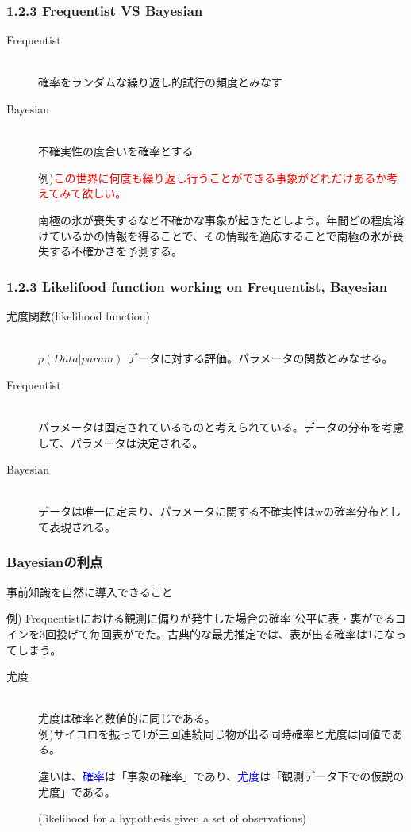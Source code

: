 \documentclass[dvipdfmx]{beamer}
\theoremstyle{definition}
\begin{document}
\begin{frame}
  \frametitle{1.2.3 Frequentist VS Bayesian}
  \begin{description}
    \item[Frequentist] \hfill \\
      確率をランダムな繰り返し的試行の頻度とみなす
    \item[Bayesian] \hfill \\
      不確実性の度合いを確率とする
      
      例)\textcolor{red}{この世界に何度も繰り返し行うことができる事象がどれだけあるか考えてみて欲しい。}
      
      南極の氷が喪失するなど不確かな事象が起きたとしよう。年間どの程度溶けているかの情報を得ることで、その情報を適応することで南極の氷が喪失する不確かさを予測する。
  \end{description}
\end{frame}

\begin{frame}
  \frametitle{1.2.3 Likelifood function  working on Frequentist, Bayesian}
  \begin{description}
    \item[尤度関数(likelihood function)] \hfill \\
      $p(Data|param)$ \quad データに対する評価。パラメータの関数とみなせる。
    \item[Frequentist] \hfill \\
      パラメータは固定されているものと考えられている。データの分布を考慮して、パラメータは決定される。
    \item[Bayesian] \hfill \\
      データは唯一に定まり、パラメータに関する不確実性はwの確率分布として表現される。
  \end{description}
\end{frame}

\begin{frame}
  \frametitle{Bayesianの利点}
  事前知識を自然に導入できること

  \begin{block}{例) Frequentistにおける観測に偏りが発生した場合の確率}
    公平に表・裏がでるコインを3回投げて毎回表がでた。古典的な最尤推定では、表が出る確率は1になってしまう。
  \end{block}
  \begin{description}
    \item[尤度] \hfill \\
      尤度は確率と数値的に同じである。
      \\
      例)サイコロを振って1が三回連続同じ物が出る同時確率と尤度は同値である。
      
      違いは、\textcolor{blue}{確率}は「事象の確率」であり、\textcolor{blue}{尤度}は「観測データ下での仮説の尤度」である。

      (likelihood for a hypothesis given a set of observations)
  \end{description}
\end{frame}
\end{document}
